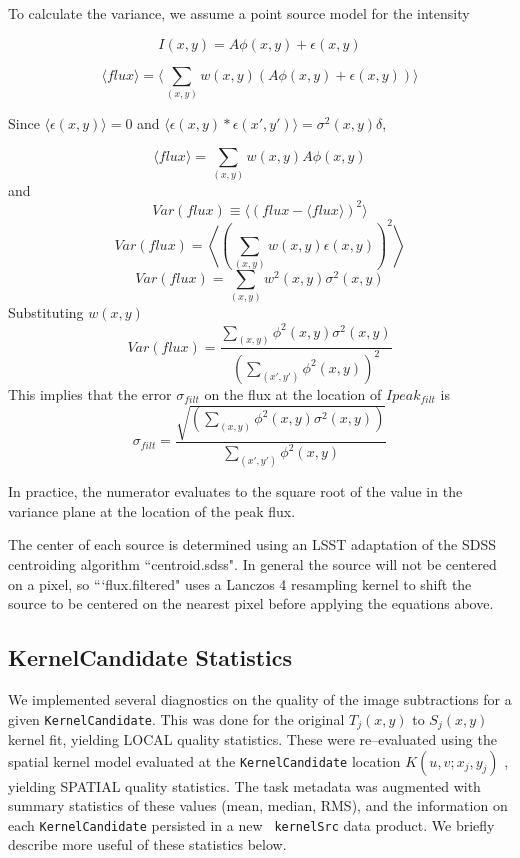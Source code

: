 \documentclass[prd, nofootinbib, floatfix, 11pt,tightenlines,times]{article}
\begin{document}
To calculate the variance, we assume a point source model for the intensity 

\[I(x,y) = A\phi(x,y) + \epsilon(x,y)\]

\[\langle flux \rangle = \langle \sum_{(x,y)} w(x,y)(A\phi(x,y) +\epsilon(x,y))\rangle\]

Since $\langle \epsilon(x,y) \rangle = 0$ and $\langle \epsilon(x,y) * \epsilon(x',y') \rangle = \sigma^2(x,y)\delta$,


\[\langle flux \rangle = \sum_{(x,y)} w(x,y)A\phi(x,y)\]
and
\[Var(flux) \equiv \langle(flux - \langle flux \rangle)^2\rangle\]
\[Var(flux) = \left\langle{\left(\sum_{(x,y)} w(x,y)\epsilon(x,y)\right)^2}\right\rangle\]
\[Var(flux) = \sum_{(x,y)} w^2(x,y)\sigma^2(x,y)\]
Substituting $w(x,y)$
\[Var(flux) = \frac{\sum_{(x,y)}\phi^2(x,y)\sigma^2(x,y)}{(\sum_{(x',y')} \phi^2(x,y))^2}\]
This implies that the error $\sigma_{filt}$ on the flux at the location of $Ipeak_{filt}$ is
\[\sigma_{filt} = \frac{\sqrt{(\sum_{(x,y)} \phi^2(x,y)\sigma^2(x,y))}}{\sum_{(x',y')} \phi^2(x,y)}\]
%
%
%

In practice, the numerator evaluates to the square root of the value in the variance plane
at the location of the peak flux.

The center of each source is determined using an LSST adaptation of
the SDSS centroiding algorithm ``centroid.sdss". In general the source
will not be centered on a pixel, so ```flux.filtered" uses a Lanczos 4
resampling kernel to shift the source to be centered on the nearest
pixel before applying the equations above.

\subsection{KernelCandidate Statistics \label{sec-stats}}

We implemented several diagnostics on the quality of the image
subtractions for a given {\tt KernelCandidate}.  This was done for the
original $T_j(x,y)$ to $S_j(x,y)$ kernel fit, yielding LOCAL quality
statistics.  These were re--evaluated using the spatial kernel model
evaluated at the {\tt KernelCandidate} location $K(u,v;x_j,y_j)$ ,
yielding SPATIAL quality statistics.  The task metadata was augmented
with summary statistics of these values (mean, median, RMS), and the
information on each {\tt KernelCandidate} persisted in a new {\tt
  kernelSrc} data product.  We briefly describe more useful of these
statistics below.
\end{document}
